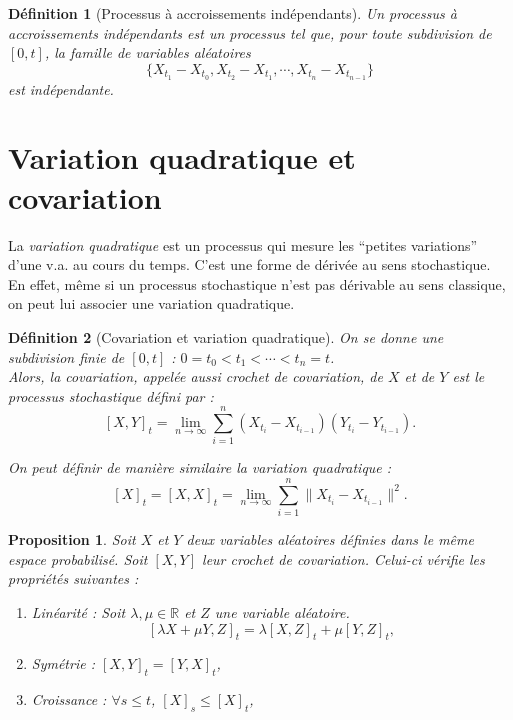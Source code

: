 \documentclass[openany]{book}
\newcommand{\R}{\mathbb{R}}
\newcommand{\1}{\mathbbm{1}}
\theoremstyle{thmfont}
\theoremstyle{deffont}
\newtheorem{definition}[definition]{Définition}
\theoremstyle{thmfont}
\newtheorem{prop}[prop]{Proposition}
\theoremstyle{deffont}
\begin{document}
\begin{definition}[Processus à accroissements indépendants]
  \label{def:pr_accr_indep} Un processus à \textit{accroissements indépendants} est un processus tel que, pour toute subdivision de $[0,t]$, la famille de variables aléatoires
    $$\{X_{t_1} - X_{t_0}, X_{t_2} - X_{t_1}, \cdots ,X_{t_n} - X_{t_{n-1}}\}$$
    est indépendante.
  \end{definition}
  
\section{Variation quadratique et covariation}

La \textit{variation quadratique} est un processus qui mesure les ``petites variations'' d'une v.a. au cours du temps. C'est une forme de dérivée au sens stochastique. En effet, même si un processus stochastique n'est pas dérivable au sens classique, on peut lui associer une variation quadratique. 

\begin{definition}[Covariation et variation quadratique] On se donne une subdivision finie de $[0,t]$ :  $0 = t_0 < t_1 < \cdots < t_n = t$.\\
  Alors, la \textit{covariation}, appelée aussi \textit{crochet de covariation}, de $X$ et de $Y$ est le processus stochastique défini par :
  $$[X,Y]_t = \lim_{n\to \infty} \sum_{i = 1}^n(X_{t_i} - X_{t_{i-1}})(Y_{t_i} - Y_{t_{i-1}}).$$

 On peut définir de manière similaire la \textit{variation quadratique} :
 $$[X]_t = [X,X]_t = \lim_{n\to \infty} \sum_{i = 1}^n\|X_{t_i} - X_{t_{i-1}}\|^2.$$
\label{def:crochet}
\end{definition}

\begin{prop} Soit $X$ et $Y$ deux variables aléatoires définies dans le même espace probabilisé. Soit $[X,Y]$ leur crochet de covariation. Celui-ci vérifie les propriétés suivantes : 
  \begin{enumerate}
  \item Linéarité : Soit $\lambda, \mu \in \R$ et $Z$ une variable aléatoire. $$[\lambda X + \mu Y, Z]_t = \lambda[X,Z]_t + \mu[Y,Z]_t,$$
  \item Symétrie : $[X,Y]_t = [Y,X]_t$,
  \item Croissance : $\forall s\leq t$, $[X]_s \leq [X]_t$,
  \end{enumerate}
\end{prop}
\end{document}
